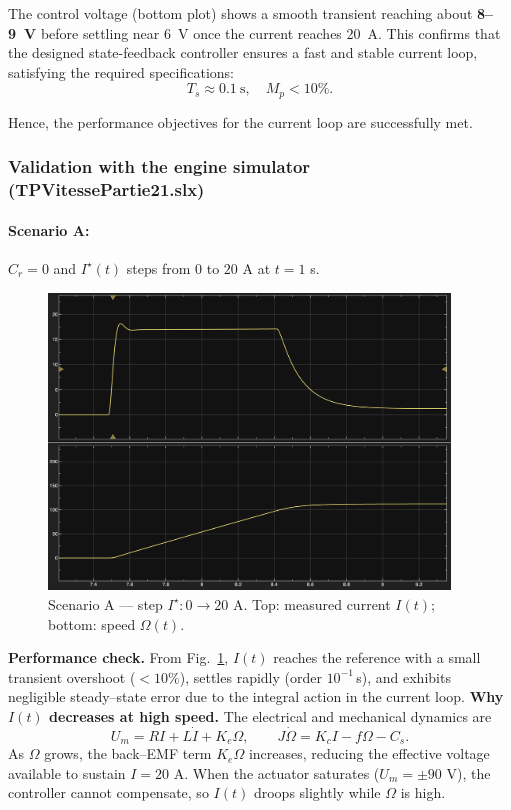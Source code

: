 \documentclass{rapportCS}
\begin{document}
The control voltage (bottom plot) shows a smooth transient reaching about \textbf{8–9~V} before settling near 6~V once the current reaches 20~A.  
This confirms that the designed state-feedback controller ensures a fast and stable current loop, satisfying the required specifications:
\[
T_s \approx 0.1~\text{s}, \quad M_p < 10\%.
\]

Hence, the performance objectives for the current loop are successfully met.

\subsubsection{Validation with the engine simulator (TPVitessePartie21.slx)}

\paragraph{Scenario A:} $C_r=0$ and $I^\star(t)$ steps from $0$ to $20$ A at $t=1$ s.

\begin{figure}[H]
\centering
\includegraphics[width=0.95\textwidth]{figures/simulink1.png}
\caption{Scenario A — step $I^\star: 0 \rightarrow 20$ A. Top: measured current $I(t)$; bottom: speed $\Omega(t)$.}
\label{fig:part21_scnA}
\end{figure}

\textbf{Performance check.} From Fig.~\ref{fig:part21_scnA}, $I(t)$ reaches the reference with a small transient overshoot ($<10\%$), settles rapidly (order $10^{-1}$\,s), and exhibits negligible steady–state error due to the integral action in the current loop.  
\textbf{Why $I(t)$ decreases at high speed.} The electrical and mechanical dynamics are
\[
U_m = R I + L \dot I + K_e \Omega,
\qquad
J \dot \Omega = K_c I - f \Omega - C_s .
\]
As $\Omega$ grows, the back–EMF term $K_e\Omega$ increases, reducing the effective voltage available to sustain $I=20$ A. When the actuator saturates ($U_m=\pm 90$ V), the controller cannot compensate, so $I(t)$ droops slightly while $\Omega$ is high.
\end{document}
